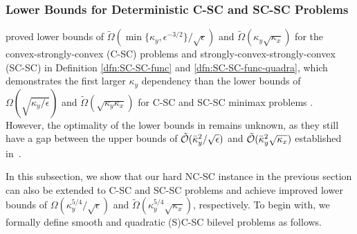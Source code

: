 \documentclass{article}
\begin{document}


\subsubsection{Lower Bounds for Deterministic C-SC and SC-SC Problems} \label{subsec:lb-det-sc}

\citet{ji2023lower} proved lower bounds of $\tilde \Omega(\min \{ \kappa_y, \epsilon^{-3/2} \} / \sqrt{\epsilon}  )$ and
$\tilde \Omega (\kappa_y \sqrt{\kappa_x})$   
for the convex-strongly-convex (C-SC) problems and
strongly-convex-strongly-convex (SC-SC) in Definition \ref{dfn:SC-SC-func} and \ref{dfn:SC-SC-func-quadra}, which demonstrates the first larger $\kappa_y$ dependency than the lower bounds of  $\Omega( \sqrt{\kappa_y/ \epsilon} )$ and $\tilde \Omega(\sqrt{\kappa_y \kappa_x})$ for C-SC and SC-SC minimax problems \citep{ouyang2021lower,zhang2022lower}.
However, the optimality of the lower bounds in \citep{ji2023lower} remains unknown, as they still have a gap between the upper bounds of $\tilde {{\mathcal{O}}}(\bar \kappa_y^2 / \sqrt{\epsilon})$ and $\tilde {{\mathcal{O}}}(\bar \kappa_y^2 \sqrt{\kappa_x})$ established in~\citep{ji2023lower}.

In this subsection, we show that our hard NC-SC instance in the previous section can also be extended to C-SC and SC-SC problems \citep{ghadimi2018approximation,ji2023lower} and achieve improved lower bounds of $\Omega(\kappa_y^{5/4} /\sqrt{\epsilon} )  $ and $\tilde \Omega( \kappa_y^{5/4} \sqrt{\kappa_x} )$, respectively. To begin with, we formally define smooth and quadratic (S)C-SC bilevel problems as follows.
\end{document}
